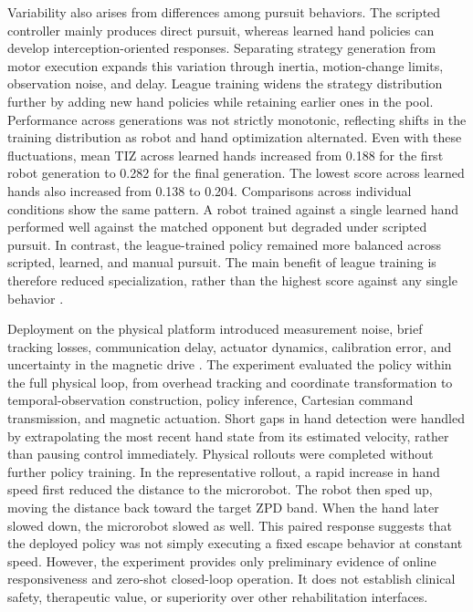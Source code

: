 \documentclass[lettersize,journal]{IEEEtran}
\begin{document}
Variability also arises from differences among pursuit behaviors. The scripted controller mainly produces direct pursuit, whereas learned hand policies can develop interception-oriented responses. Separating strategy generation from motor execution expands this variation through inertia, motion-change limits, observation noise, and delay. League training widens the strategy distribution further by adding new hand policies while retaining earlier ones in the pool. Performance across generations was not strictly monotonic, reflecting shifts in the training distribution as robot and hand optimization alternated. Even with these fluctuations, mean TIZ across learned hands increased from 0.188 for the first robot generation to 0.282 for the final generation. The lowest score across learned hands also increased from 0.138 to 0.204. Comparisons across individual conditions show the same pattern. A robot trained against a single learned hand performed well against the matched opponent but degraded under scripted pursuit. In contrast, the league-trained policy remained more balanced across scripted, learned, and manual pursuit. The main benefit of league training is therefore reduced specialization, rather than the highest score against any single behavior \cite{lanctotUnifiedMARL2017,vinyalsAlphaStar2019,jaderbergPopulationGames2019,huangOpponentAwareLeague2023}.

Deployment on the physical platform introduced measurement noise, brief tracking losses, communication delay, actuator dynamics, calibration error, and uncertainty in the magnetic drive \cite{tobinDomainRandomization2017,pengDynamicsRandomization2018,muratoreRandomizedSimulations2022,chebotarClosingSimReal2019,tiboniDROPO2023}. The experiment evaluated the policy within the full physical loop, from overhead tracking and coordinate transformation to temporal-observation construction, policy inference, Cartesian command transmission, and magnetic actuation. Short gaps in hand detection were handled by extrapolating the most recent hand state from its estimated velocity, rather than pausing control immediately. Physical rollouts were completed without further policy training. In the representative rollout, a rapid increase in hand speed first reduced the distance to the microrobot. The robot then sped up, moving the distance back toward the target ZPD band. When the hand later slowed down, the microrobot slowed as well. This paired response suggests that the deployed policy was not simply executing a fixed escape behavior at constant speed. However, the experiment provides only preliminary evidence of online responsiveness and zero-shot closed-loop operation. It does not establish clinical safety, therapeutic value, or superiority over other rehabilitation interfaces.
\end{document}
